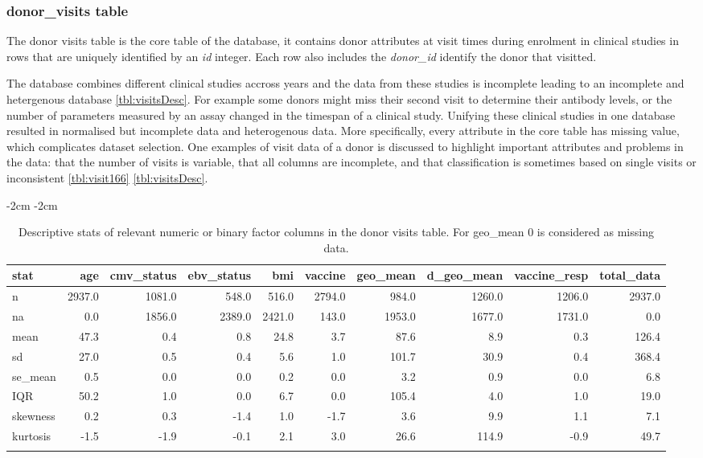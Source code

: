 \subsubsection{donor\_visits table}

The donor visits table is the core table of the database, it contains donor
attributes at visit times during enrolment in clinical studies in rows that are
uniquely identified by an \textit{id} integer. Each
row also includes the \textit{donor\_id} identify the donor that visitted.

The database combines different clinical studies accross years and the data
from these studies is incomplete leading to an incomplete and hetergenous
database \autoref{tbl:visitsDesc}. For example some donors might miss their
second visit to determine their antibody levels, or the number of parameters
measured by an assay changed in the timespan of a clinical study. Unifying
these clinical studies in one database resulted in normalised but incomplete
data and heterogenous data. More specifically, every attribute in the core
table has missing value, which complicates dataset selection. One examples of
visit data of a donor is discussed to highlight important attributes and
problems in the data: that the number of visits is variable, that all columns
are incomplete, and that classification is sometimes based on single visits or
inconsistent \autoref{tbl:visit166} \autoref{tbl:visitsDesc}.

\begin{table}
\addtolength{\leftskip} {-2cm} %
\addtolength{\rightskip} {-2cm} %
\begin{tabular}{lrrrrrrrrr}
\toprule{}
stat & age & cmv\_status & ebv\_status & bmi & vaccine & geo\_mean & d\_geo\_mean & vaccine\_resp & total\_data\\
\midrule{}
n & 2937.0 & 1081.0 & 548.0 & 516.0 & 2794.0 & 984.0 & 1260.0 & 1206.0 & 2937.0\\
na & 0.0 & 1856.0 & 2389.0 & 2421.0 & 143.0 & 1953.0 & 1677.0 & 1731.0 & 0.0\\
mean & 47.3 & 0.4 & 0.8 & 24.8 & 3.7 & 87.6 & 8.9 & 0.3 & 126.4\\
sd & 27.0 & 0.5 & 0.4 & 5.6 & 1.0 & 101.7 & 30.9 & 0.4 & 368.4\\
se\_mean & 0.5 & 0.0 & 0.0 & 0.2 & 0.0 & 3.2 & 0.9 & 0.0 & 6.8\\
\addlinespace
IQR & 50.2 & 1.0 & 0.0 & 6.7 & 0.0 & 105.4 & 4.0 & 1.0 & 19.0\\
skewness & 0.2 & 0.3 & -1.4 & 1.0 & -1.7 & 3.6 & 9.9 & 1.1 & 7.1\\
kurtosis & -1.5 & -1.9 & -0.1 & 2.1 & 3.0 & 26.6 & 114.9 & -0.9 & 49.7\\
\bottomrule{}
\end{tabular}
\caption{Descriptive stats of relevant numeric or binary factor columns in the
    donor visits table. For geo\_mean 0 is considered as missing data.}\label{tbl:visitsDesc}
\end{table}

